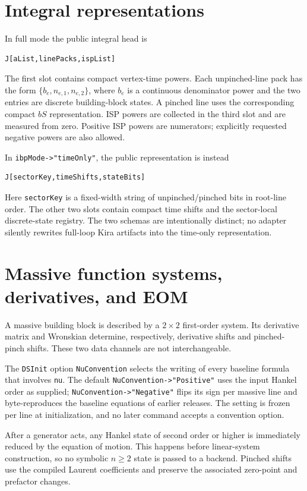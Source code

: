 ﻿\documentclass[a4paper,11pt]{article}
\begin{document}
\section{Integral representations}

In full mode the public integral head is
\begin{verbatim}
J[aList,linePacks,ispList]
\end{verbatim}
The first slot contains compact vertex-time powers. Each unpinched-line pack has the form
$\{b_e,n_{e,1},n_{e,2}\}$, where $b_e$ is a continuous denominator power and the two
entries are discrete building-block states. A pinched line uses the corresponding compact
$bS$ representation. ISP powers are collected in the third slot and are measured from zero.
Positive ISP powers are numerators; explicitly requested negative powers are also allowed.

In \texttt{ibpMode->"timeOnly"}, the public representation is instead
\begin{verbatim}
J[sectorKey,timeShifts,stateBits]
\end{verbatim}
Here \texttt{sectorKey} is a fixed-width string of unpinched/pinched bits in root-line order.
The other two slots contain compact time shifts and the sector-local discrete-state registry.
The two schemas are intentionally distinct; no adapter silently rewrites full-loop Kira
artifacts into the time-only representation.

\section{Massive function systems, derivatives, and EOM}

A massive building block is described by a $2\times2$ first-order system. Its derivative
matrix and Wronskian determine, respectively, derivative shifts and pinched-pinch shifts.
These two data channels are not interchangeable.

The \texttt{DSInit} option \texttt{NuConvention} selects the writing of every baseline
formula that involves \texttt{nu}. The default \texttt{NuConvention->"Positive"} uses the
input Hankel order as supplied; \texttt{NuConvention->"Negative"} flips its sign per massive
line and byte-reproduces the baseline equations of earlier releases. The setting is frozen
per line at initialization, and no later command accepts a convention option.

After a generator acts, any Hankel state of second order or higher is immediately reduced
by the equation of motion. This happens before linear-system construction, so no symbolic
$n\geq2$ state is passed to a backend. Pinched shifts use the compiled Laurent coefficients
and preserve the associated zero-point and prefactor changes.
\end{document}
